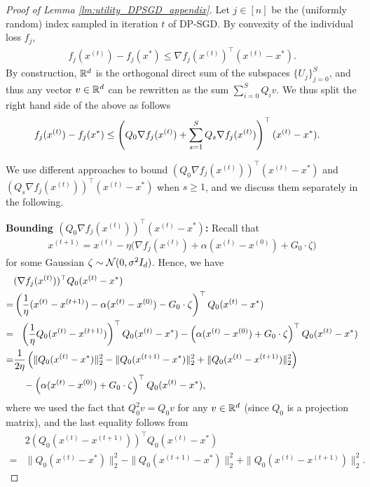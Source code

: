 \begin{proof}[Proof of Lemma \ref{lm:utility_DPSGD_appendix}]
Let $j \in [n]$ be the (uniformly random) index sampled in iteration $t$ of DP-SGD.
By convexity of the individual loss $f_j$,
\begin{align*}
    f_{j}(x^{(t)})-f_{j}(x^{*})\leq\nabla f_{j}(x^{(t)})^{\top}(x^{(t)}-x^{*}).
\end{align*}
By construction, $\mathbb{R}^d$ is the orthogonal direct sum of the subspaces $\{U_j\}_{j=0}^S$, and thus any vector $v\in \mathbb{R}^d$ can be rewritten as the sum $\sum_{i=0}^S Q_i v $.
We thus split the right hand side of the above as follows
\begin{align}
f_{j}(x^{(t)})-f_{j}(x^{*}) & \leq \left( Q_{0}\nabla f_{j}(x^{(t)})+\sum_{s=1}^{S}Q_{s}\nabla f_{j}(x^{(t)})\right)^{\top}(x^{(t)}-x^{*}).\label{eq:mirror_two_term}
\end{align}

We use different approaches to bound $(Q_0\nabla f_j(x^{(t)}))^\top (x^{(t)}-x^*)$ and $(Q_s\nabla f_j(x^{(t)}))^\top (x^{(t)}-x^*)$ when $s\geq 1$, and we discuss them separately in the following.

\medskip
{\bf  Bounding  $(Q_0\nabla f_j(x^{(t)}))^\top (x^{(t)}-x^*)$:} Recall that
\begin{align*}
    x^{(t+1)}=x^{(t)}-\eta\Big(\nabla f_j(x^{(t)})+\alpha(x^{(t)}-x^{(0)})+G_{0}\cdot \zeta\Big)
\end{align*}
for some Gaussian $\zeta\sim \mathcal N(0,\sigma^{2}I_d)$. 
Hence, we have
\begin{align}
\label{eq:duality_Q_0}
    &(\nabla f_{j}(x^{(t)}))^{\top}Q_{0}(x^{(t)}-x^{*})  \\
    =& \left(\frac{1}{\eta}(x^{(t)}-x^{(t+1)})-\alpha(x^{(t)}-x^{(0)})-G_{0}\cdot\zeta\right)^{\top}Q_{0}(x^{(t)}-x^{*})\nonumber \\
= & ~~ \left(\frac{1}{\eta}Q_0(x^{(t)}-x^{(t+1)})\right)^{\top}Q_{0}(x^{(t)}-x^{*})-\left(
\alpha(x^{(t)}-x^{(0)})+G_{0}\cdot\zeta
\right)^\top Q_0(x^{(t)}-x^*)\nonumber \\
=& \frac{1}{2\eta}
    \left(
        \|Q_{0}(x^{(t)}-x^{*})\|_2^{2} - 
        \|Q_{0}(x^{(t+1)}-x^{*})\|_2^{2} + 
        \|Q_{0}(x^{(t)}-x^{(t+1)})\|_2^{2}
    \right)
\nonumber \\
 ~& \quad -\left(\alpha(x^{(t)}-x^{(0)})+G_{0}\cdot\zeta\right)^{\top}Q_{0}(x^{(t)}-x^{*}),
\end{align}
where we used the fact that $Q_0^2 v = Q_0 v$ for any $v \in \mathbb{R}^d$ (since $Q_0$ is a projection matrix), and the last equality follows from 
\begin{align*}
   &2(Q_0(x^{(t)}-x^{(t+1)}))^\top Q_0(x^{(t)}-x^*) \\
   =& \|Q_{0}(x^{(t)}-x^{*})\|_2^{2} - 
    \|Q_{0}(x^{(t+1)}-x^{*})\|_2^{2} + 
    \|Q_{0}(x^{(t)}-x^{(t+1)})\|_2^{2}.
\end{align*}


\end{proof}
